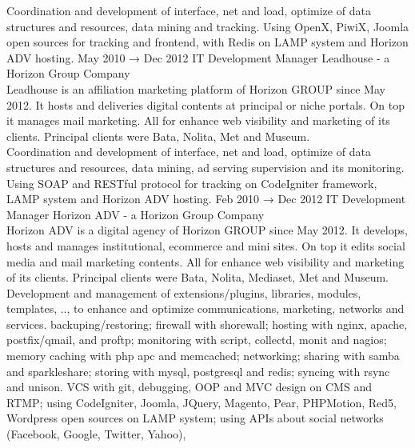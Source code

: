 \documentclass[8pt]{stackoverflow-upgraded-version} %
\begin{document}
\begin{entrylist}
{		 Coordination and development of interface, net and load, optimize of data structures and resources, data mining and tracking.
		Using OpenX, PiwiX, Joomla open sources for tracking and frontend, with Redis on LAMP system and Horizon ADV hosting.}
	\entry
		{May 2010 → Dec 2012}
		{IT Development Manager}
		{Leadhouse - a Horizon Group Company}
		{\\
		 Leadhouse is an affiliation marketing platform of Horizon GROUP since May 2012. It hosts and
		deliveries digital contents at principal or niche portals. On top it manages mail marketing. All for enhance web visibility and
		marketing of its clients. Principal clients were Bata, Nolita, Met and Museum.\vspace{1mm}\\
		 Coordination and development of interface, net and load, optimize of data structures and resources, data
		mining, ad serving supervision and its monitoring. Using SOAP and RESTful protocol for tracking on CodeIgniter framework,
		LAMP system and Horizon ADV hosting.}
	\entry
		{Feb 2010 → Dec 2012}
		{IT Development Manager}
		{Horizon ADV - a Horizon Group Company}
		{\\
		 Horizon ADV is a digital agency of Horizon GROUP since May 2012. It develops, hosts and manages
		institutional, ecommerce and mini sites. On top it edits social media and mail marketing contents. All for enhance web
		visibility and marketing of its clients. Principal clients were Bata, Nolita, Mediaset, Met and Museum.\vspace{1mm}\\
		 Development and management of extensions/plugins, libraries, modules, templates, .., to enhance and optimize
		communications, marketing, networks and services.  backuping/restoring; firewall with shorewall; hosting with
		nginx, apache, postfix/qmail, and proftp; monitoring with script, collectd, monit and nagios; memory caching with php apc and
		memcached; networking; sharing with samba and sparkleshare; storing with mysql, postgresql and redis; syncing with rsync
		and unison.  VCS with git, debugging, OOP and MVC design on CMS and RTMP; using CodeIgniter, Joomla, JQuery,
		Magento, Pear, PHPMotion, Red5, Wordpress open sources on LAMP system; using APIs about social networks (Facebook, Google, Twitter, Yahoo),
}
\end{entrylist}
\end{document}
